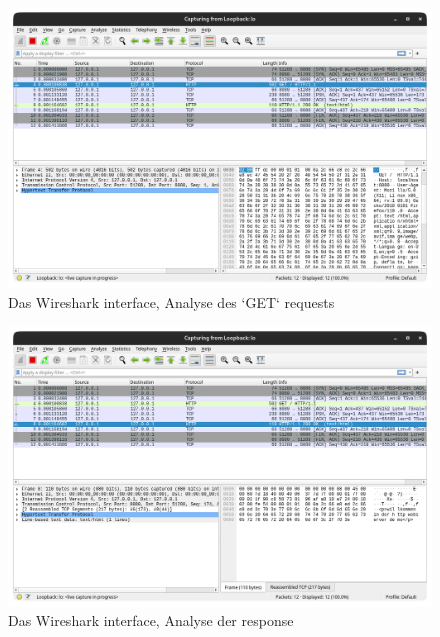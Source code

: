 \documentclass[12pt]{article}
\begin{document}
\begin{figure}[h]
	\centering
	\includegraphics[scale=0.3]{Bilder/Anlagen_4}
	\caption{Das Wireshark interface, Analyse des `GET` requests \cite{screenshots-self}}
	\label{fig:figure33}
\end{figure}

\begin{figure}[h]
	\centering
	\includegraphics[scale=0.3]{Bilder/Anlagen_5}
	\caption{Das Wireshark interface, Analyse der response \cite{screenshots-self}}
	\label{fig:figure34}
\end{figure}
\end{document}
